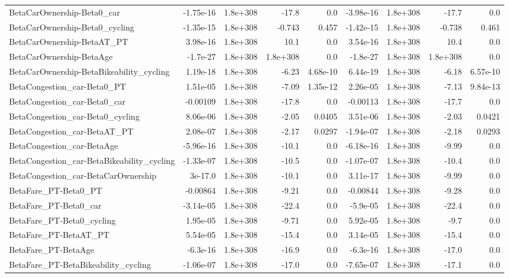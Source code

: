 \begin{tabular}{lrrrrrrrr}
BetaCarOwnership-Beta0_car & -1.75e-16 & 1.8e+308 & -17.8 & 0.0 & -3.98e-16 & 1.8e+308 & -17.7 & 0.0 \\
BetaCarOwnership-Beta0_cycling & -1.35e-15 & 1.8e+308 & -0.743 & 0.457 & -1.42e-15 & 1.8e+308 & -0.738 & 0.461 \\
BetaCarOwnership-BetaAT_PT & 3.98e-16 & 1.8e+308 & 10.1 & 0.0 & 3.54e-16 & 1.8e+308 & 10.4 & 0.0 \\
BetaCarOwnership-BetaAge & -1.7e-27 & 1.8e+308 & 1.8e+308 & 0.0 & -1.8e-27 & 1.8e+308 & 1.8e+308 & 0.0 \\
BetaCarOwnership-BetaBikeability_cycling & 1.19e-18 & 1.8e+308 & -6.23 & 4.68e-10 & 6.44e-19 & 1.8e+308 & -6.18 & 6.57e-10 \\
BetaCongestion_car-Beta0_PT & 1.51e-05 & 1.8e+308 & -7.09 & 1.35e-12 & 2.26e-05 & 1.8e+308 & -7.13 & 9.84e-13 \\
BetaCongestion_car-Beta0_car & -0.00109 & 1.8e+308 & -17.8 & 0.0 & -0.00113 & 1.8e+308 & -17.7 & 0.0 \\
BetaCongestion_car-Beta0_cycling & 8.06e-06 & 1.8e+308 & -2.05 & 0.0405 & 3.51e-06 & 1.8e+308 & -2.03 & 0.0421 \\
BetaCongestion_car-BetaAT_PT & 2.08e-07 & 1.8e+308 & -2.17 & 0.0297 & -1.94e-07 & 1.8e+308 & -2.18 & 0.0293 \\
BetaCongestion_car-BetaAge & -5.96e-16 & 1.8e+308 & -10.1 & 0.0 & -6.18e-16 & 1.8e+308 & -9.99 & 0.0 \\
BetaCongestion_car-BetaBikeability_cycling & -1.33e-07 & 1.8e+308 & -10.5 & 0.0 & -1.07e-07 & 1.8e+308 & -10.4 & 0.0 \\
BetaCongestion_car-BetaCarOwnership & 3e-17.0 & 1.8e+308 & -10.1 & 0.0 & 3.11e-17 & 1.8e+308 & -9.99 & 0.0 \\
BetaFare_PT-Beta0_PT & -0.00864 & 1.8e+308 & -9.21 & 0.0 & -0.00844 & 1.8e+308 & -9.28 & 0.0 \\
BetaFare_PT-Beta0_car & -3.14e-05 & 1.8e+308 & -22.4 & 0.0 & -5.9e-05 & 1.8e+308 & -22.4 & 0.0 \\
BetaFare_PT-Beta0_cycling & 1.95e-05 & 1.8e+308 & -9.71 & 0.0 & 5.92e-05 & 1.8e+308 & -9.7 & 0.0 \\
BetaFare_PT-BetaAT_PT & 5.54e-05 & 1.8e+308 & -15.4 & 0.0 & 3.14e-05 & 1.8e+308 & -15.4 & 0.0 \\
BetaFare_PT-BetaAge & -6.3e-16 & 1.8e+308 & -16.9 & 0.0 & -6.3e-16 & 1.8e+308 & -17.0 & 0.0 \\
BetaFare_PT-BetaBikeability_cycling & -1.06e-07 & 1.8e+308 & -17.0 & 0.0 & -7.65e-07 & 1.8e+308 & -17.1 & 0.0 \\

\end{tabular}
